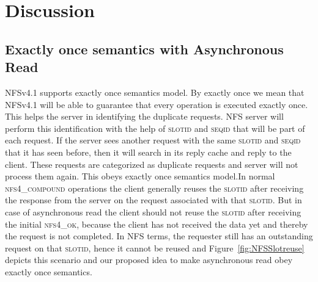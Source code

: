 \section{Discussion}
\subsection{Exactly once semantics with Asynchronous Read}

	NFSv4.1 supports exactly once semantics model. By exactly once we mean that NFSv4.1 will be able to guarantee that every operation is executed exactly once. This helps the server in identifying the duplicate requests. NFS server will perform this identification with the help of \textsc{slotid} and \textsc{seqid} that will be part of each request. If the server sees another request with the same \textsc{slotid} and \textsc{seqid} that it has seen before, then it will search in  its reply cache and reply to the client. These requests are categorized as duplicate requests and server will not process them again. This obeys exactly once semantics model.In normal \textsc{nfs4\_compound} operations the client generally reuses the \textsc{slotid} after receiving the response from the server on the request associated with that \textsc{slotid}. But in case of asynchronous read the client should not reuse the \textsc{slotid} after receiving the initial \textsc{nfs4\_ok}, because the client has not received the data yet and thereby the request is not completed. In NFS terms, the requester still has an outstanding request on that \textsc{slotid}, hence it cannot be reused and Figure~\ref{fig:NFSSlotreuse} depicts this scenario and our proposed idea to make asynchronous read obey exactly once semantics.